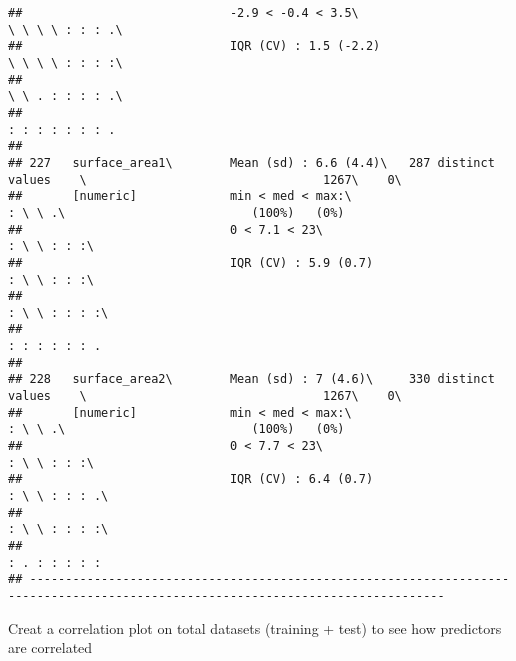\documentclass[]{article}
\begin{document}
\begin{verbatim}
##                             -2.9 < -0.4 < 3.5\                              \ \ \ \ : : : .\                                    
##                             IQR (CV) : 1.5 (-2.2)                           \ \ \ \ : : : :\                                    
##                                                                             \ \ . : : : : .\                                    
##                                                                             : : : : : : : .                                     
## 
## 227   surface_area1\        Mean (sd) : 6.6 (4.4)\   287 distinct values    \                                 1267\    0\       
##       [numeric]             min < med < max:\                               : \ \ .\                          (100%)   (0%)     
##                             0 < 7.1 < 23\                                   : \ \ : : :\                                        
##                             IQR (CV) : 5.9 (0.7)                            : \ \ : : :\                                        
##                                                                             : \ \ : : : :\                                      
##                                                                             : : : : : : .                                       
## 
## 228   surface_area2\        Mean (sd) : 7 (4.6)\     330 distinct values    \                                 1267\    0\       
##       [numeric]             min < med < max:\                               : \ \ .\                          (100%)   (0%)     
##                             0 < 7.7 < 23\                                   : \ \ : : :\                                        
##                             IQR (CV) : 6.4 (0.7)                            : \ \ : : : .\                                      
##                                                                             : \ \ : : : :\                                      
##                                                                             : . : : : : :                                       
## --------------------------------------------------------------------------------------------------------------------------------
\end{verbatim}

Creat a correlation plot on total datasets (training + test) to see how
predictors are correlated
\end{document}
